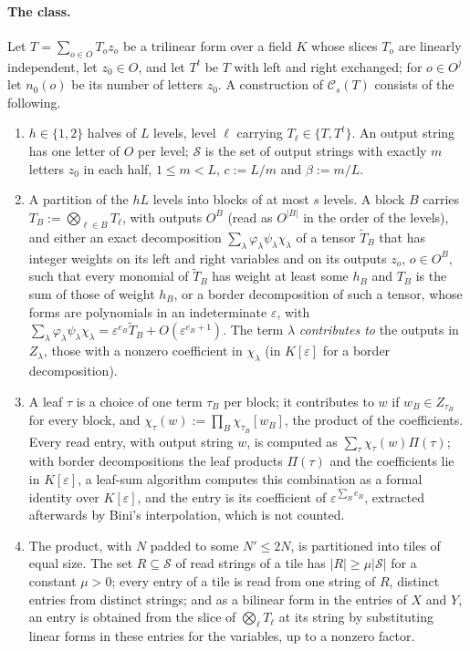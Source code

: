\documentclass[11pt]{article}
\theoremstyle{definition}
\theoremstyle{remark}
\begin{document}
\paragraph{The class.} Let $T=\sum_{o\in O}T_oz_o$ be a trilinear form over a field $K$ whose slices $T_o$ are linearly independent, let $z_0\in O$, and let $T^t$ be $T$ with left and right exchanged; for $o\in O^j$ let $n_0(o)$ be its number of letters $z_0$. A construction of $\mathcal C_s(T)$ consists of the following.
\begin{enumerate}[label=(\roman*),nosep]
\item $h\in\{1,2\}$ halves of $L$ levels, level $\ell$ carrying $T_\ell\in\{T,T^t\}$. An output string has one letter of $O$ per level; $\mathcal S$ is the set of output strings with exactly $m$ letters $z_0$ in each half, $1\le m<L$, $c:=L/m$ and $\beta:=m/L$.
\item A partition of the $hL$ levels into blocks of at most $s$ levels. A block $B$ carries $T_B:=\bigotimes_{\ell\in B}T_\ell$, with outputs $O^B$ (read as $O^{|B|}$ in the order of the levels), and either an exact decomposition $\sum_\lambda\varphi_\lambda\psi_\lambda\chi_\lambda$ of a tensor $\tilde T_B$ that has integer weights on its left and right variables and on its outputs $z_o$, $o\in O^B$, such that every monomial of $\tilde T_B$ has weight at least some $h_B$ and $T_B$ is the sum of those of weight $h_B$, or a border decomposition of such a tensor, whose forms are polynomials in an indeterminate $\varepsilon$, with $\sum_\lambda\varphi_\lambda\psi_\lambda\chi_\lambda=\varepsilon^{e_B}\tilde T_B+O(\varepsilon^{e_B+1})$. The term $\lambda$ \emph{contributes to} the outputs in $Z_\lambda$, those with a nonzero coefficient in $\chi_\lambda$ (in $K[\varepsilon]$ for a border decomposition).
\item A leaf $\tau$ is a choice of one term $\tau_B$ per block; it contributes to $w$ if $w_B\in Z_{\tau_B}$ for every block, and $\chi_\tau(w):=\prod_B\chi_{\tau_B}[w_B]$, the product of the coefficients. Every read entry, with output string $w$, is computed as $\sum_\tau\chi_\tau(w)\Pi(\tau)$; with border decompositions the leaf products $\Pi(\tau)$ and the coefficients lie in $K[\varepsilon]$, a leaf-sum algorithm computes this combination as a formal identity over $K[\varepsilon]$, and the entry is its coefficient of $\varepsilon^{\sum_Be_B}$, extracted afterwards by Bini's interpolation, which is not counted.
\item The product, with $N$ padded to some $N'\le2N$, is partitioned into tiles of equal size. The set $R\subseteq\mathcal S$ of read strings of a tile has $|R|\ge\mu|\mathcal S|$ for a constant $\mu>0$; every entry of a tile is read from one string of $R$, distinct entries from distinct strings; and as a bilinear form in the entries of $X$ and $Y$, an entry is obtained from the slice of $\bigotimes_\ell T_\ell$ at its string by substituting linear forms in these entries for the variables, up to a nonzero factor.
\end{enumerate}
\end{document}
